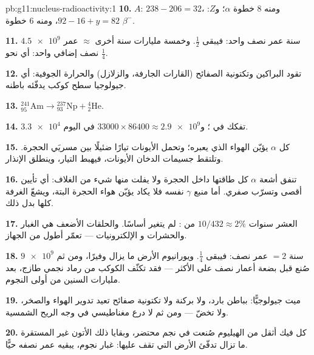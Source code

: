 \begin{solution}{pb:g11:nucleus-radioactivity:1}
\textbf{10.} $A$: $238 - 206 = 32$، ومنه $8$ خطوة $\alpha$؛ و$Z$:
$92 - 16 + y = 82$، ومنه $6$ خطوة $\beta^-$.

\textbf{11.} $\num{4.5e9}$ سنة عمر نصف واحد: فيبقى $\frac12$. وخمسة
مليارات سنة أخرى $\approx$ عمر نصف إضافي واحد: أي نحو $\frac14$.

\textbf{12.} تقود البراكين وتكتونية الصفائح (القارات الجارفة،
والزلازل) والحرارة الجوفية: أي جيولوجيا سطح كوكب يدفّئه
باطنه.

\textbf{13.} ${}^{241}_{95}\mathrm{Am} \to {}^{237}_{93}\mathrm{Np} +
{}^{4}_{2}\mathrm{He}$.

\textbf{14.} $\num{3.3e4}$ تفكك في ؛
و$\num{33000} \times 86400 \approx \num{2.9e9}$ في اليوم.

\textbf{15.} كل $\alpha$ يؤيّن الهواء الذي يعبره؛ وتحمل الأيونات
تيارًا ضئيلًا بين مسريَي الحجرة. وتلتقط جسيمات الدخان
الأيونات، فيهبط التيار، وينطلق الإنذار.

\textbf{16.} تنفق أشعة $\alpha$ كل طاقتها داخل الحجرة ولا
يفلت منها شيء من الغلاف: أي تأيين أقصى وتسرّب صفري. أما منبع
$\gamma$  نفسه فلا يكاد يؤيّن هواء الحجرة البتة، ويشعّ
الغرفة كلها بدل ذلك.

\textbf{17.} العشر سنوات $10/432 \approx 2\%$ من : 
لم يتغير أساسًا. والحلقات الأضعف هي الغبار والحشرات و
الإلكترونيات ---  تعمّر أطول من الجهاز.

\textbf{18.} $\num{9e9}$ سنة $= 2$ عمر نصف: فيبقى $\frac14$.
ويورانيوم الأرض ما يزال وفيرًا، ومن ثم صُنع قبل بضعة
أعمار نصف على الأكثر --- فقد تكثّف الكوكب من رماد نجمي طازج، بعد
مليارات السنين من أولى النجوم.

\textbf{19.} ميت جيولوجيًّا: بباطن بارد، ولا بركنة ولا تكتونية
صفائح تعيد تدوير الهواء والصخر، ولا  تخضّ --- ومن ثم لا
درع مغناطيسي في وجه الريح الشمسية.

\textbf{20.} كل  فيك أثقل من الهيليوم صُنعت في نجم محتضر،
وبقايا ذلك الأتون غير المستقرة ما تزال تدفّئ الأرض التي تقف
عليها: غبار نجوم، يبقيه عمر نصفه حيًّا.
\end{solution}
